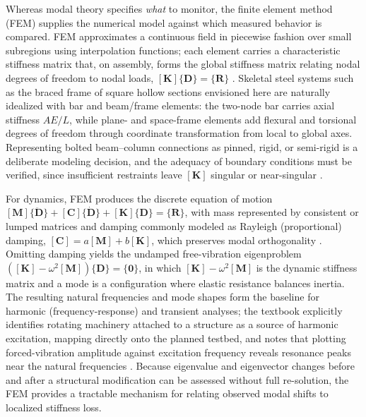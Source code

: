 Whereas modal theory specifies \textit{what} to monitor, the finite element method (FEM) supplies the numerical model against which measured behavior is compared. FEM approximates a continuous field in piecewise fashion over small subregions using interpolation functions; each element carries a characteristic stiffness matrix that, on assembly, forms the global stiffness matrix relating nodal degrees of freedom to nodal loads, $[\mathbf{K}]\{\mathbf{D}\} = \{\mathbf{R}\}$ \citep{cook2002fea}. Skeletal steel systems such as the braced frame of square hollow sections envisioned here are naturally idealized with bar and beam/frame elements: the two-node bar carries axial stiffness $AE/L$, while plane- and space-frame elements add flexural and torsional degrees of freedom through coordinate transformation from local to global axes. Representing bolted beam--column connections as pinned, rigid, or semi-rigid is a deliberate modeling decision, and the adequacy of boundary conditions must be verified, since insufficient restraints leave $[\mathbf{K}]$ singular or near-singular \citep{cook2002fea}.

For dynamics, FEM produces the discrete equation of motion $[\mathbf{M}]\{\ddot{\mathbf{D}}\} + [\mathbf{C}]\{\dot{\mathbf{D}}\} + [\mathbf{K}]\{\mathbf{D}\} = \{\mathbf{R}\}$, with mass represented by consistent or lumped matrices and damping commonly modeled as Rayleigh (proportional) damping, $[\mathbf{C}] = a[\mathbf{M}] + b[\mathbf{K}]$, which preserves modal orthogonality \citep{cook2002fea}. Omitting damping yields the undamped free-vibration eigenproblem $([\mathbf{K}] - \omega^2[\mathbf{M}])\{\mathbf{D}\} = \{\mathbf{0}\}$, in which $[\mathbf{K}] - \omega^2[\mathbf{M}]$ is the dynamic stiffness matrix and a mode is a configuration where elastic resistance balances inertia. The resulting natural frequencies and mode shapes form the baseline for harmonic (frequency-response) and transient analyses; the textbook explicitly identifies rotating machinery attached to a structure as a source of harmonic excitation, mapping directly onto the planned testbed, and notes that plotting forced-vibration amplitude against excitation frequency reveals resonance peaks near the natural frequencies \citep{cook2002fea}. Because eigenvalue and eigenvector changes before and after a structural modification can be assessed without full re-solution, the FEM provides a tractable mechanism for relating observed modal shifts to localized stiffness loss.

